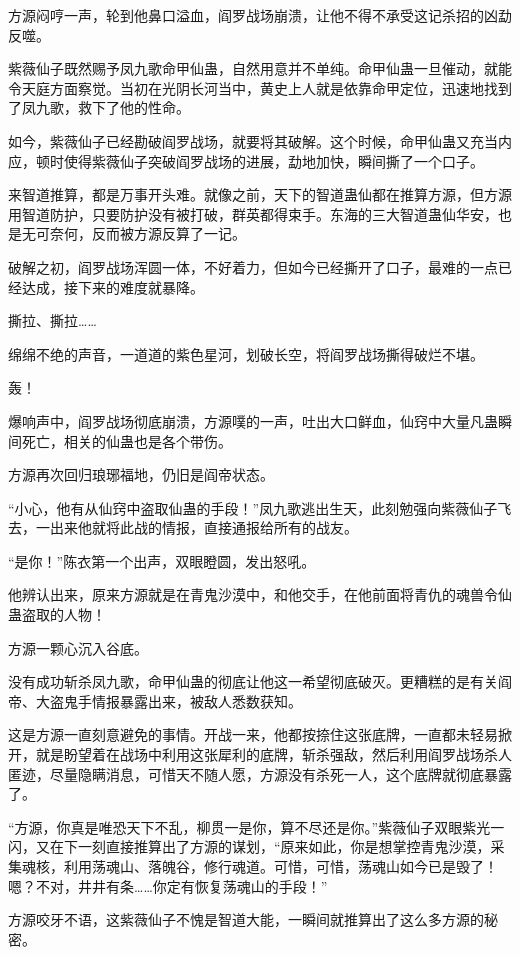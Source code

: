 \begin{this_body}
方源闷哼一声，轮到他鼻口溢血，阎罗战场崩溃，让他不得不承受这记杀招的凶勐反噬。

紫薇仙子既然赐予凤九歌命甲仙蛊，自然用意并不单纯。命甲仙蛊一旦催动，就能令天庭方面察觉。当初在光阴长河当中，黄史上人就是依靠命甲定位，迅速地找到了凤九歌，救下了他的性命。

如今，紫薇仙子已经勘破阎罗战场，就要将其破解。这个时候，命甲仙蛊又充当内应，顿时使得紫薇仙子突破阎罗战场的进展，勐地加快，瞬间撕了一个口子。

来智道推算，都是万事开头难。就像之前，天下的智道蛊仙都在推算方源，但方源用智道防护，只要防护没有被打破，群英都得束手。东海的三大智道蛊仙华安，也是无可奈何，反而被方源反算了一记。

破解之初，阎罗战场浑圆一体，不好着力，但如今已经撕开了口子，最难的一点已经达成，接下来的难度就暴降。

撕拉、撕拉……

绵绵不绝的声音，一道道的紫色星河，划破长空，将阎罗战场撕得破烂不堪。

轰！

爆响声中，阎罗战场彻底崩溃，方源噗的一声，吐出大口鲜血，仙窍中大量凡蛊瞬间死亡，相关的仙蛊也是各个带伤。

方源再次回归琅琊福地，仍旧是阎帝状态。

“小心，他有从仙窍中盗取仙蛊的手段！”凤九歌逃出生天，此刻勉强向紫薇仙子飞去，一出来他就将此战的情报，直接通报给所有的战友。

“是你！”陈衣第一个出声，双眼瞪圆，发出怒吼。

他辨认出来，原来方源就是在青鬼沙漠中，和他交手，在他前面将青仇的魂兽令仙蛊盗取的人物！

方源一颗心沉入谷底。

没有成功斩杀凤九歌，命甲仙蛊的彻底让他这一希望彻底破灭。更糟糕的是有关阎帝、大盗鬼手情报暴露出来，被敌人悉数获知。

这是方源一直刻意避免的事情。开战一来，他都按捺住这张底牌，一直都未轻易掀开，就是盼望着在战场中利用这张犀利的底牌，斩杀强敌，然后利用阎罗战场杀人匿迹，尽量隐瞒消息，可惜天不随人愿，方源没有杀死一人，这个底牌就彻底暴露了。

“方源，你真是唯恐天下不乱，柳贯一是你，算不尽还是你。”紫薇仙子双眼紫光一闪，又在下一刻直接推算出了方源的谋划，“原来如此，你是想掌控青鬼沙漠，采集魂核，利用荡魂山、落魄谷，修行魂道。可惜，可惜，荡魂山如今已是毁了！嗯？不对，井井有条……你定有恢复荡魂山的手段！”

方源咬牙不语，这紫薇仙子不愧是智道大能，一瞬间就推算出了这么多方源的秘密。


\end{this_body}
